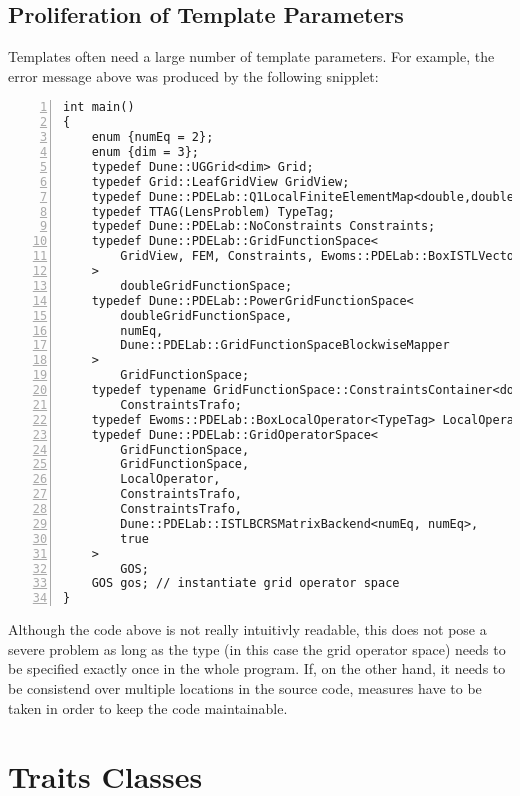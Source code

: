 \subsection*{Proliferation of Template Parameters}

Templates often need a large number of template parameters. For
example, the error message above was produced by the following
snipplet:
\begin{lstlisting}[basicstyle=\ttfamily\scriptsize,numbers=left,numberstyle=\tiny, numbersep=5pt]
int main()
{
    enum {numEq = 2};
    enum {dim = 3};
    typedef Dune::UGGrid<dim> Grid;
    typedef Grid::LeafGridView GridView;
    typedef Dune::PDELab::Q1LocalFiniteElementMap<double,double,dim> FEM;
    typedef TTAG(LensProblem) TypeTag;
    typedef Dune::PDELab::NoConstraints Constraints;
    typedef Dune::PDELab::GridFunctionSpace<
        GridView, FEM, Constraints, Ewoms::PDELab::BoxISTLVectorBackend<TypeTag>
    >
        doubleGridFunctionSpace;
    typedef Dune::PDELab::PowerGridFunctionSpace<
        doubleGridFunctionSpace,
        numEq,
        Dune::PDELab::GridFunctionSpaceBlockwiseMapper
    >
        GridFunctionSpace;
    typedef typename GridFunctionSpace::ConstraintsContainer<double>::Type 
        ConstraintsTrafo;
    typedef Ewoms::PDELab::BoxLocalOperator<TypeTag> LocalOperator;
    typedef Dune::PDELab::GridOperatorSpace<
        GridFunctionSpace,
        GridFunctionSpace,
        LocalOperator,
        ConstraintsTrafo,
        ConstraintsTrafo,
        Dune::PDELab::ISTLBCRSMatrixBackend<numEq, numEq>,
        true
    >
        GOS;
    GOS gos; // instantiate grid operator space
}
\end{lstlisting}

Although the code above is not really intuitivly readable, this does
not pose a severe problem as long as the type (in this case the grid
operator space) needs to be specified exactly once in the whole
program. If, on the other hand, it needs to be consistend over
multiple locations in the source code, measures have to be taken in
order to keep the code maintainable. 

\section{Traits Classes}

